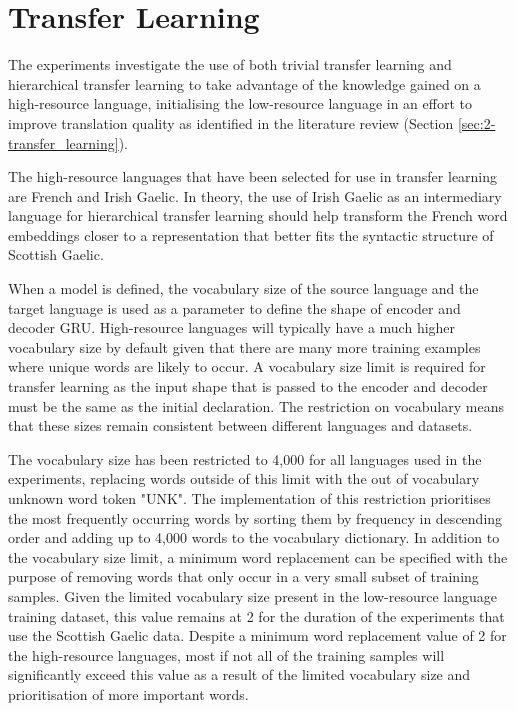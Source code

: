 \section{Transfer Learning}
\label{sec:3-transfer_learning}

The experiments investigate the use of both trivial transfer learning and hierarchical transfer learning to take advantage of the knowledge gained on a high-resource language, initialising the low-resource language in an effort to improve translation quality as identified in the literature review (Section \ref{sec:2-transfer_learning}).

The high-resource languages that have been selected for use in transfer learning are French and Irish Gaelic. In theory, the use of Irish Gaelic as an intermediary language for hierarchical transfer learning should help transform the French word embeddings closer to a representation that better fits the syntactic structure of Scottish Gaelic.


%
When a model is defined, the vocabulary size of the source language and the target language is used as a parameter to define the shape of encoder and decoder \acrshort{GRU}. High-resource languages will typically have a much higher vocabulary size by default given that there are many more training examples where unique words are likely to occur. A vocabulary size limit is required for transfer learning as the input shape that is passed to the encoder and decoder must be the same as the initial declaration. The restriction on vocabulary means that these sizes remain consistent between different languages and datasets.

The vocabulary size has been restricted to 4,000 for all languages used in the experiments, replacing words outside of this limit with the out of vocabulary unknown word token "UNK". The implementation of this restriction prioritises the most frequently occurring words by sorting them by frequency in descending order and adding up to 4,000 words to the vocabulary dictionary.
In addition to the vocabulary size limit, a minimum word replacement can be specified with the purpose of removing words that only occur in a very small subset of training samples. Given the limited vocabulary size present in the low-resource language training dataset, this value remains at 2 for the duration of the experiments that use the Scottish Gaelic data. Despite a minimum word replacement value of 2 for the high-resource languages, most if not all of the training samples will significantly exceed this value as a result of the limited vocabulary size and prioritisation of more important words.

